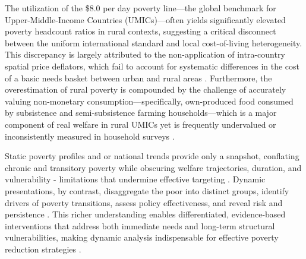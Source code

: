 \documentclass[12pt,a4paper]{article}
\begin{document}
The utilization of the \$8.0 per day poverty line—the global benchmark for Upper-Middle-Income Countries (UMICs)—often yields significantly elevated poverty headcount ratios in rural contexts, suggesting a critical disconnect between the uniform international standard and local cost-of-living heterogeneity. This discrepancy is largely attributed to the non-application of intra-country spatial price deflators, which fail to account for systematic differences in the cost of a basic needs basket between urban and rural areas \citep{chen2020, dabalen2019}. Furthermore, the overestimation of rural poverty is compounded by the challenge of accurately valuing non-monetary consumption—specifically, own-produced food consumed by subsistence and semi-subsistence farming households—which is a major component of real welfare in rural UMICs yet is frequently undervalued or inconsistently measured in household surveys \citep{ravallion2008}. \\

Static poverty profiles  and or national trends provide only a snapshot, conflating chronic and transitory poverty while obscuring welfare trajectories, duration, and vulnerability - limitations that undermine effective targeting \cite{BaulchHoddinott2000}. Dynamic presentations, by contrast, disaggregate the poor into distinct groups, identify drivers of poverty transitions, assess policy effectiveness, and reveal risk and persistence \cite{BarrettCarter2016}. This richer understanding enables differentiated, evidence-based interventions that address both immediate needs and long-term structural vulnerabilities, making dynamic analysis indispensable for effective poverty reduction strategies \cite{CarterBarrett2006, Dercon2005, HulmeShepherd2003}.
\end{document}
